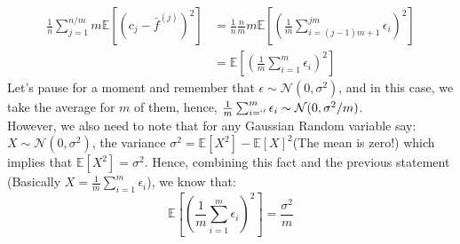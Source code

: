 \documentclass[]{article}
\begin{document}
		\begin{align*}\tag{B.1.c.3}\label{eqn:B.1.c.3}
			\frac{1}{n}\sum_{j = 1}^{n/m}
			m\mathbb{E}\left[
				(c_j - \bar{f}^{(j)})^2
			\right]
			&=
			\frac{1}{n}\frac{n}{m}m \mathbb{E}\left[
				\left(
					\frac{1}{m}\sum_{i = (j - 1)m + 1}^{jm}\epsilon_i
				\right)^2
			\right]
			\\
			&= \mathbb{E}\left[
				\left(
					\frac{1}{m}\sum_{i = 1}^{m}\epsilon_i
				\right)^2
			\right]
		\end{align*}
		Let's pause for a moment and remember that $\epsilon \sim \mathcal{N}(0, \sigma^2)$, and in this case, we take the average for $m$ of them, hence, $\frac{1}{m}\sum_{i = `'}^{m}\epsilon_i\sim \mathcal{N}(0, \sigma^2/m)$. 
		\\
		However, we also need to note that for any Gaussian Random variable say: $X\sim \mathcal{N}(0, \sigma^2)$, the variance $\sigma^2 = \mathbb{E}\left[X^2\right] - \mathbb{E}\left[X\right]^2$(The mean is zero!) which implies that $\mathbb{E}\left[X^2\right] = \sigma^2$. Hence, combining this fact and the previous statement (Basically $X = \frac{1}{m}\sum_{i = 1}^{m}\epsilon_i$), we know that: 
		\begin{equation*}\tag{B.1.c.4}\label{eqn:B.1.c.4}
			\mathbb{E}\left[
				\left(
					\frac{1}{m}\sum_{i = 1}^{m}\epsilon_i
				\right)^2
			\right] = \frac{\sigma^2}{m}
		\end{equation*}
\end{document}
